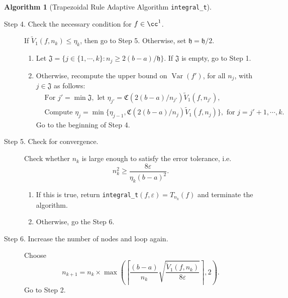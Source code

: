 \documentclass{iitthesis}
\DeclareMathOperator{\Var}{Var}
\theoremstyle{definition}
\newtheorem{algo}{Algorithm}
\theoremstyle{remark}
\begin{document}
\begin{algo}[Trapezoidal Rule Adaptive Algorithm {\tt integral\_t}]
\begin{description}
\item[Step 4. Check the necessary condition for $f \in \cc^1$.] If $\widetilde{V}_1(f,n_k) \le \eta_{k}$, then go to Step 5.
  Otherwise, set $\mathfrak{h} = \mathfrak{h}/2$.
    \begin{enumerate}[label=\alph*)]
      \item Let $\mathfrak{J}=\{j\in\{1, \cdots, k\}: n_{j}\ge 2(b-a)/\mathfrak{h}\}$. If $\mathfrak{J}$ is empty, go to Step 1.
      \item Otherwise, recompute the upper bound on $\Var(f')$, for all $n_{j}$, with $j \in \mathfrak{J}$ as follows:
      \begin{align*}
        &\text{For } j'=\min\mathfrak{J}, \text{ let } \eta_{j'}=\mathfrak{C}(2(b-a)/n_{j'})\widetilde{V}_1(f,n_{j'}), \\
        &\text{Compute } \eta_{j}=\min\{\eta_{j-1},\mathfrak{C}(2(b-a)/n_{j})\widetilde{V}_1(f,n_{j})\}, \text{ for } j=j'+1, \cdots, k.
      \end{align*}
        Go to the beginning of Step 4.
    \end{enumerate}


\item[Step 5. Check for convergence.] Check whether $n_k$ is large enough to satisfy the error tolerance, i.e.
    \begin{equation*}
         n_k^2 \ge \frac{8\varepsilon }{\eta_{k}(b-a)^2}.
    \end{equation*}

    \begin{enumerate}[label=\alph*)]
      \item If this is true, return {\tt integral\_t}$(f,\varepsilon)=T_{n_k}(f)$ and terminate the algorithm.
      \item Otherwise, go the Step 6.
    \end{enumerate}


\item[Step 6. Increase the number of nodes and loop again.] Choose
$$
n_{k+1}=n_k\times\max\left(\left\lceil\frac{(b-a)}{n_{k}}\sqrt{\frac{\widetilde{V}_1(f,n_k)}{8\varepsilon}}\right\rceil,2\right).
$$
Go to Step 2.
\end{description}
\end{algo}
\end{document}
